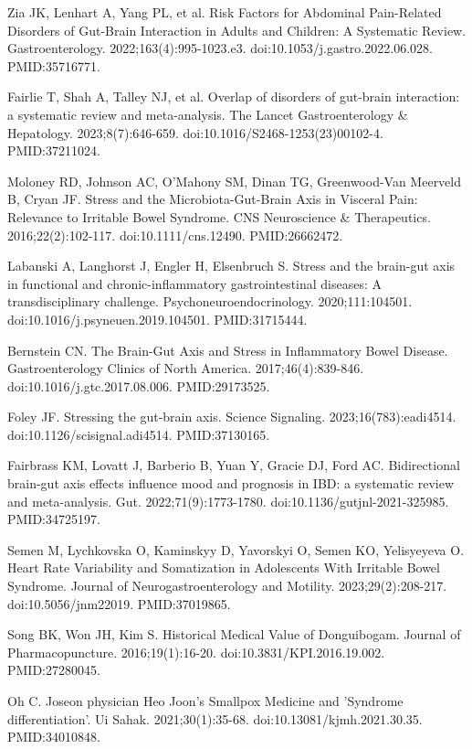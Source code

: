 \documentclass[12pt,oneside]{book}
\newcommand{\reff}[2]{\par\hangindent=7mm\hangafter=1\noindent[#1]\hspace{2mm}#2\par}
\begin{document}
\reff{7}{Zia JK, Lenhart A, Yang PL, et al. Risk Factors for Abdominal Pain-Related Disorders of Gut-Brain Interaction in Adults and Children: A Systematic Review. Gastroenterology. 2022;163(4):995-1023.e3. doi:10.1053/j.gastro.2022.06.028. PMID:35716771.}

\reff{8}{Fairlie T, Shah A, Talley NJ, et al. Overlap of disorders of gut-brain interaction: a systematic review and meta-analysis. The Lancet Gastroenterology \& Hepatology. 2023;8(7):646-659. doi:10.1016/S2468-1253(23)00102-4. PMID:37211024.}

\reff{9}{Moloney RD, Johnson AC, O'Mahony SM, Dinan TG, Greenwood-Van Meerveld B, Cryan JF. Stress and the Microbiota-Gut-Brain Axis in Visceral Pain: Relevance to Irritable Bowel Syndrome. CNS Neuroscience \& Therapeutics. 2016;22(2):102-117. doi:10.1111/cns.12490. PMID:26662472.}

\reff{10}{Labanski A, Langhorst J, Engler H, Elsenbruch S. Stress and the brain-gut axis in functional and chronic-inflammatory gastrointestinal diseases: A transdisciplinary challenge. Psychoneuroendocrinology. 2020;111:104501. doi:10.1016/j.psyneuen.2019.104501. PMID:31715444.}

\reff{11}{Bernstein CN. The Brain-Gut Axis and Stress in Inflammatory Bowel Disease. Gastroenterology Clinics of North America. 2017;46(4):839-846. doi:10.1016/j.gtc.2017.08.006. PMID:29173525.}

\reff{12}{Foley JF. Stressing the gut-brain axis. Science Signaling. 2023;16(783):eadi4514. doi:10.1126/scisignal.adi4514. PMID:37130165.}

\reff{13}{Fairbrass KM, Lovatt J, Barberio B, Yuan Y, Gracie DJ, Ford AC. Bidirectional brain-gut axis effects influence mood and prognosis in IBD: a systematic review and meta-analysis. Gut. 2022;71(9):1773-1780. doi:10.1136/gutjnl-2021-325985. PMID:34725197.}

\reff{14}{Semen M, Lychkovska O, Kaminskyy D, Yavorskyi O, Semen KO, Yelisyeyeva O. Heart Rate Variability and Somatization in Adolescents With Irritable Bowel Syndrome. Journal of Neurogastroenterology and Motility. 2023;29(2):208-217. doi:10.5056/jnm22019. PMID:37019865.}

\reff{15}{Song BK, Won JH, Kim S. Historical Medical Value of Donguibogam. Journal of Pharmacopuncture. 2016;19(1):16-20. doi:10.3831/KPI.2016.19.002. PMID:27280045.}

\reff{16}{Oh C. Joseon physician Heo Joon's Smallpox Medicine and 'Syndrome differentiation'. Ui Sahak. 2021;30(1):35-68. doi:10.13081/kjmh.2021.30.35. PMID:34010848.}
\end{document}
